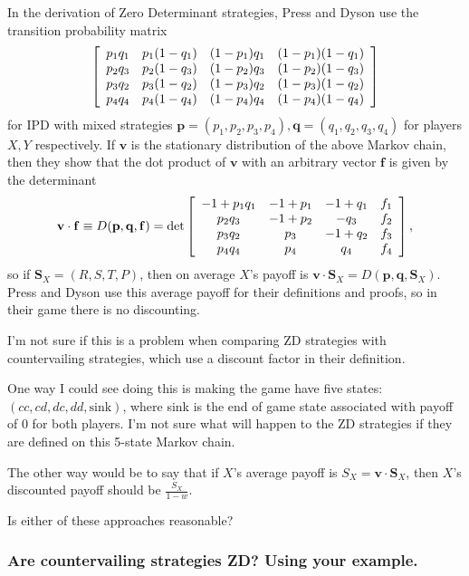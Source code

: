In the derivation of Zero Determinant strategies, Press and Dyson use the transition probability matrix 
\[
\left[
\begin{array}{c c c c}
p_1q_1 & p_1 (1-q_1) & (1-p_1)q_1 & (1-p_1)(1-q_1) \\
p_2q_3 & p_2 (1-q_3) & (1-p_2)q_3 & (1-p_2)(1-q_3) \\
p_3q_2 & p_3 (1-q_2) & (1-p_3)q_2 & (1-p_3)(1-q_2) \\
p_4q_4 & p_4 (1-q_4) & (1-p_4)q_4 & (1-p_4)(1-q_4)
\end{array}
\right]
\]
for IPD with mixed strategies $\mathbf{p} = (p_1, p_2, p_3, p_4), \mathbf{q} = (q_1, q_2, q_3, q_4)$ for players $X, Y$ respectively. If $\mathbf{v}$ is the stationary distribution of the above Markov chain, then they show that the dot product of $\mathbf{v}$ with an arbitrary vector $\mathbf{f}$ is given by the determinant
\[
\mathbf{v}\cdot \mathbf{f} \equiv D(\mathbf{p}, \mathbf{q}, \mathbf{f})
= \det
\left[
\begin{array}{c c c c}
-1 + p_1 q_1    &	-1 + p_1	&	-1 + q_1	&	f_1 \\
p_2 q_3         &	-1 + p_2	&	-q_3		&	f_2 \\
p_3 q_2 		&	p_3			&	-1 + q_2	&	f_3 \\
p_4 q_4			&	p_4			&	q_4			&	f_4
\end{array}
\right],
\]
so if $\mathbf{S}_X = (R, S, T, P)$, then on average $X$'s payoff is $\mathbf{v}\cdot\mathbf{S}_X = D(\mathbf{p}, \mathbf{q}, \mathbf{S}_X)$. Press and Dyson use this average payoff for their definitions and proofs, so in their game there is no discounting.

I'm not sure if this is a problem when comparing ZD strategies with countervailing strategies, which use a discount factor in their definition.

One way I could see doing this is making the game have five states: $(cc, cd, dc, dd, \textrm{sink})$, where sink is the end of game state associated with payoff of 0 for both players. I'm not sure what will happen to the ZD strategies if they are defined on this 5-state Markov chain.

The other way would be to say that if $X$'s average payoff is $S_X = \mathbf{v}\cdot\mathbf{S}_X$, then $X$'s discounted payoff should be $\frac{S_X}{1-w}$.

Is either of these approaches reasonable?

\subsubsection{Are countervailing strategies ZD? Using your example.}

